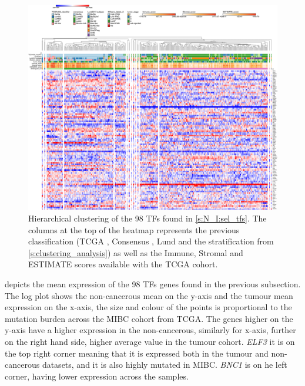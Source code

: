 \begin{appendices}
\begin{figure}[H]   
\centering
\includegraphics[width=1.0\textwidth,height=1.0\textheight,keepaspectratio]{Sections/Network_I/Resources/selective_pruning/15_CS_norm_sel_tfs.png}
  \caption{Hierarchical clustering of the 98 TFs found in \cref{s:N_I:sel_tfs}. The columns at the top of the heatmap represents the previous classification (TCGA \cite{Robertson2017-mg}, Consensus \cite{Kamoun2020-tj}, Lund \cite{Marzouka2018-ge} and the stratification from \cref{s:clustering_analysis}) as well as the Immune, Stromal and ESTIMATE scores available with the TCGA cohort.}
\label{fig:ap:morph_sel_tfs}
\end{figure}

 depicts the mean expression of the 98 TFs genes found in the previous subsection. The log plot shows the non-cancerous mean on the y-axis and the tumour mean expression on the x-axis, the size and colour of the points is proportional to the mutation burden across the MIBC cohort from TCGA. The genes higher on the y-axis have a higher expression in the non-cancerous, similarly for x-axis, further on the right hand side, higher average value in the tumour cohort. \textit{ELF3} it is on the top right corner meaning that it is expressed both in the tumour and non-cancerous datasets, and it is also highly mutated in MIBC. \textit{BNC1} is on he left corner, having lower expression across the samples.


\end{appendices}
